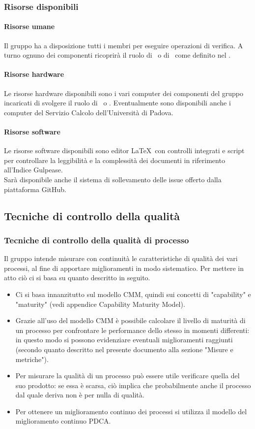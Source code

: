 \documentclass[../PianoDiQualifica.tex]{subfiles}
\begin{document}
		    \subsubsection{Risorse disponibili}
			    \paragraph{Risorse umane}
			    Il gruppo ha a disposizione tutti i membri per eseguire operazioni di verifica. A turno ognuno dei componenti ricoprirà il ruolo di \responsabilediprogetto\ o di \verificatore\ come definito nel \pianodiprogettov.
			    \paragraph{Risorse hardware}
			    Le risorse hardware disponibili sono i vari computer dei componenti del gruppo incaricati di svolgere il ruolo di \responsabilediprogetto\ o \verificatore. Eventualmente sono disponibili anche i computer del Servizio Calcolo dell'Università di Padova.
				\paragraph{Risorse software}
				Le risorse software disponibili sono editor \LaTeX \ con controlli integrati e script per controllare la leggibilità e la complessità dei documenti in riferimento all'Indice Gulpease.\\
				Sarà disponibile anche il sistema di sollevamento delle issue offerto dalla piattaforma GitHub.
		\subsection{Tecniche di controllo della qualità}
			\subsubsection{Tecniche di controllo della qualità di processo}
			Il gruppo intende misurare con continuità le caratteristiche di qualità dei vari processi, al fine di apportare miglioramenti in modo sistematico. Per mettere in atto ciò ci si basa su quanto descritto in seguito.
			\begin{itemize}
				\item Ci si basa innanzitutto sul modello CMM, quindi sui concetti di "capability" e "maturity" (vedi appendice Capability Maturity Model).
				\item Grazie all'uso del modello CMM è possibile calcolare il livello di maturità di un processo per confrontare le performance dello stesso in momenti differenti: in questo modo si possono evidenziare eventuali miglioramenti raggiunti (secondo quanto descritto nel presente documento alla sezione "Misure e metriche").
				\item Per misurare la qualità di un processo può essere utile verificare quella del suo prodotto: se essa è scarsa, ciò implica che probabilmente anche il processo dal quale deriva non è per nulla di qualità.
				\item Per ottenere un miglioramento continuo dei processi si utilizza il modello del miglioramento continuo PDCA.
			\end{itemize}
\end{document}
